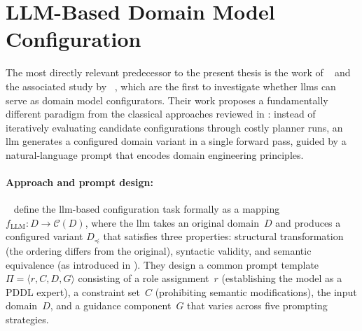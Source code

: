 \section{LLM-Based Domain Model Configuration}
\label{sec:rw:llm_config}

The most directly relevant predecessor to the present thesis is the work of \citeauthor{Elis2025}~\cite{Elis2025} and the associated study by \citeauthor{Georgievski2025}~\cite{Georgievski2025}, which are the first to investigate whether \glspl{llm} can serve as domain model configurators.
Their work proposes a fundamentally different paradigm from the classical approaches reviewed in : instead of iteratively evaluating candidate configurations through costly planner runs, an \gls{llm} generates a configured domain variant in a single forward pass, guided by a natural-language prompt that encodes domain engineering principles.

\paragraph{Approach and prompt design:}
\citeauthor{Georgievski2025}~\cite{Georgievski2025} define the \gls{llm}-based configuration task formally as a mapping $f_{\text{LLM}} : D \rightarrow \mathcal{C}(D)$, where the \gls{llm} takes an original domain~$D$ and produces a configured variant $D_{\preceq}$ that satisfies three properties: structural transformation (the ordering differs from the original), syntactic validity, and semantic equivalence (as introduced in ).
They design a common prompt template $\Pi = \langle r, C, D, G \rangle$ consisting of a role assignment~$r$ (establishing the model as a PDDL expert), a constraint set~$C$ (prohibiting semantic modifications), the input domain~$D$, and a guidance component~$G$ that varies across five prompting strategies.


